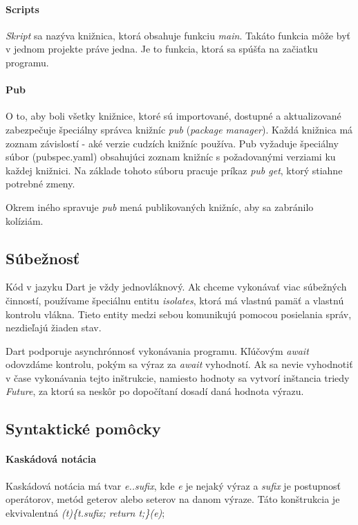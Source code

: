 \paragraph{Scripts}
\emph{Skript} sa nazýva knižnica, ktorá obsahuje funkciu \emph{main}. Takáto funkcia môže byť v jednom projekte práve jedna. Je to funkcia, ktorá sa spúšťa na začiatku programu.

\paragraph{Pub}
O to, aby boli všetky knižnice, ktoré sú importované, dostupné a aktualizované zabezpečuje špeciálny správca knižníc \emph{pub} (\emph{package manager}). 
Každá knižnica má zoznam závislostí - aké verzie cudzích knižníc používa. 
Pub vyžaduje špeciálny súbor (pubspec.yaml) obsahujúci zoznam knižníc s požadovanými verziami ku každej knižnici. Na základe tohoto súboru pracuje príkaz \emph{pub get}, ktorý stiahne potrebné zmeny.

Okrem iného spravuje \emph{pub} mená publikovaných knižníc, aby sa zabránilo kolíziám.

\subsection{Súbežnosť}%
Kód v jazyku Dart je vždy jednovláknový. Ak chceme vykonávať viac súbežných činností, používame špeciálnu entitu \emph{isolates}, ktorá má vlastnú pamäť a vlastnú kontrolu vlákna. Tieto entity medzi sebou komunikujú pomocou posielania správ, nezdieľajú žiaden stav.

Dart podporuje asynchrónnosť vykonávania programu. Kľúčovým \emph{await} odovzdáme kontrolu, pokým sa výraz za \emph{await} vyhodnotí. Ak sa nevie vyhodnotiť v čase vykonávania tejto inštrukcie, namiesto hodnoty sa vytvorí inštancia triedy \emph{Future}, za ktorú sa neskôr po dopočítaní dosadí daná hodnota výrazu.%

\subsection{Syntaktické pomôcky}

\paragraph{Kaskádová notácia}
Kaskádová notácia má tvar \emph{e..sufix}, kde \emph{e} je nejaký výraz a \emph{sufix} je postupnosť operátorov, metód geterov alebo seterov na danom výraze. Táto konštrukcia je ekvivalentná \emph{(t)\{t.sufix; return t;\}(e)};

